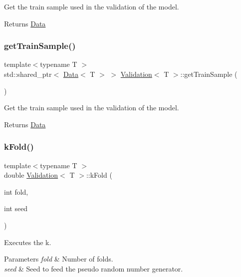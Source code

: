Get the train sample used in the validation of the model. 

\begin{DoxyReturn}{Returns}
\mbox{\hyperlink{class_data}{Data}} 
\end{DoxyReturn}
\mbox{\label{class_validation_a11cf518681b25799f231ce973ad45095}} 
\subsubsection{\texorpdfstring{get\+Train\+Sample()}{getTrainSample()}}
{\footnotesize\ttfamily template$<$typename T $>$ \\
std\+::shared\+\_\+ptr$<$ \mbox{\hyperlink{class_data}{Data}}$<$ T $>$ $>$ \mbox{\hyperlink{class_validation}{Validation}}$<$ T $>$\+::get\+Train\+Sample (\begin{DoxyParamCaption}{ }\end{DoxyParamCaption})}



Get the train sample used in the validation of the model. 

\begin{DoxyReturn}{Returns}
\mbox{\hyperlink{class_data}{Data}} 
\end{DoxyReturn}
\mbox{\label{class_validation_a1a5825e2dd051a72aaffd423a0df55f1}} 
\subsubsection{\texorpdfstring{k\+Fold()}{kFold()}}
{\footnotesize\ttfamily template$<$typename T $>$ \\
double \mbox{\hyperlink{class_validation}{Validation}}$<$ T $>$\+::k\+Fold (\begin{DoxyParamCaption}\item[{int}]{fold,  }\item[{int}]{seed }\end{DoxyParamCaption})}



Executes the k. 


\begin{DoxyParams}{Parameters}
{\em fold} & Number of folds. \\
\hline
{\em seed} & Seed to feed the pseudo random number generator. \\
\hline
\end{DoxyParams}
\mbox{\label{class_validation_a1e9580697a164d4bfbe721f2f1589c57}} 
